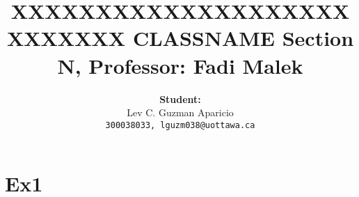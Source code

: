 \documentclass[16pt, lettersize]{article}
\title{XXXXXXXXXXXXXXXXXXXXXXXXXXX \newline \newline
	  \large \textbf{ CLASSNAME Section N, Professor: Fadi Malek} }
\author{\Large \textbf{Student:} \\ Lev C. Guzman Aparicio \\ 
		\texttt{300038033, lguzm038@uottawa.ca}}
\begin{document}
	\maketitle
	
	\section{Ex1}
	
\end{document}
